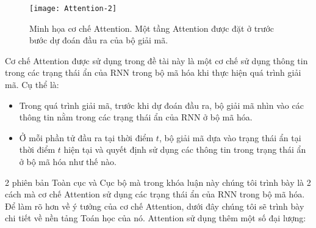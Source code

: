 \begin{figure}
	\centering
	\texttt{[image: Attention-2]}
	\caption[Minh họa cơ chế Attention.]{Minh họa cơ chế Attention. Một tầng Attention được đặt ở trước bước dự đoán đầu ra của bộ giải mã.}
	\label{fig_Attention}
\end{figure}
Cơ chế Attention được sử dụng trong đề tài này là một cơ chế sử dụng thông tin trong các trạng thái ẩn của RNN trong bộ mã hóa khi thực hiện quá trình giải mã. Cụ thể là:
\begin{itemize}
	\item Trong quá trình giải mã, trước khi dự đoán đầu ra, bộ giải mã nhìn vào các thông tin nằm trong các trạng thái ẩn của RNN ở bộ mã hóa.
	\item Ở mỗi phần tử đầu ra tại thời điểm $t$, bộ giải mã dựa vào trạng thái ẩn tại thời điểm $t$ hiện tại và quyết định sử dụng các thông tin trong trạng thái ẩn ở bộ mã hóa như thế nào.
\end{itemize}
2 phiên bản Toàn cục và Cục bộ mà trong khóa luận này chúng tôi trình bày là 2 cách mà cơ chế Attention sử dụng các trạng thái ẩn của RNN trong bộ mã hóa.
Để làm rõ hơn về ý tưởng của cơ chế Attention, dưới đây chúng tôi sẽ trình bày chi tiết về nền tảng Toán học của nó.
Attention sử dụng thêm một số đại lượng:
